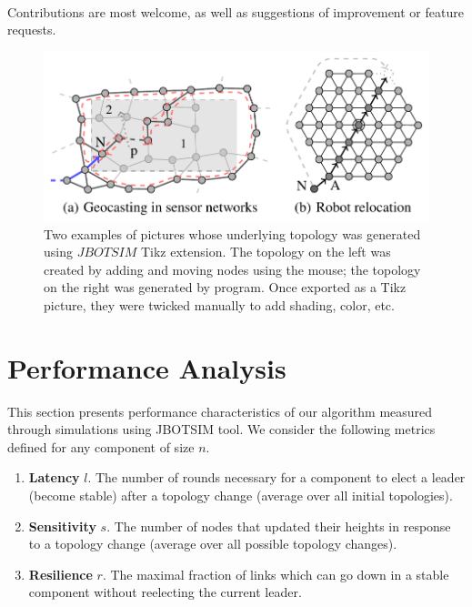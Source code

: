 \paragraph{}Contributions are most welcome, as well as suggestions of improvement or feature requests.

\begin{figure}[h]
	\centering
	\includegraphics[width=0.7\linewidth]{fig_7}
	\caption[Two examples of pictures whose underlying topology was generated using $JBOTSIM$ Tikz extension. The topology on the left was created by adding and moving nodes using the mouse; the topology on the right was generated by program. Once exported as a Tikz picture, they were twicked manually to add shading, color, etc.]{Two examples of pictures whose underlying topology was generated using $JBOTSIM$ Tikz extension. The topology on the left was created by adding and moving nodes using the mouse; the topology on the right was generated by program. Once exported as a Tikz picture, they were twicked manually to add shading, color, etc.}
	\label{fig:fig7}
\end{figure}


\section{Performance Analysis}

This section presents performance characteristics of our algorithm measured through simulations using JBOTSIM\cite{26} tool. We consider the following metrics defined for any component of size $n$.

\begin{enumerate}
	\item \textbf{Latency} $l$. The number of rounds necessary for a component to elect a leader (become stable) after a topology change (average over all initial topologies).
	
	\item \textbf{Sensitivity} $s$. The number of nodes that updated their heights in response to a topology change (average over all possible topology changes).
	
	\item \textbf{Resilience} $r$. The maximal fraction of links which can go down in a stable component without reelecting the current leader.
	
\end{enumerate}

